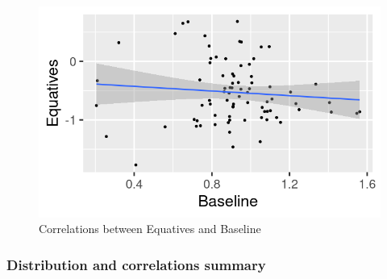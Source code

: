 \documentclass[
  letterpaper,
  DIV=11,
  numbers=noendperiod]{scrartcl}
\begin{document}
\begin{figure}

{\centering \includegraphics{"equatives_baseline_corr.png"}

}

\caption{Correlations between Equatives and Baseline}

\end{figure}

\hypertarget{distribution-and-correlations-summary}{%
\subsubsection{Distribution and correlations
summary}\label{distribution-and-correlations-summary}}
\end{document}
